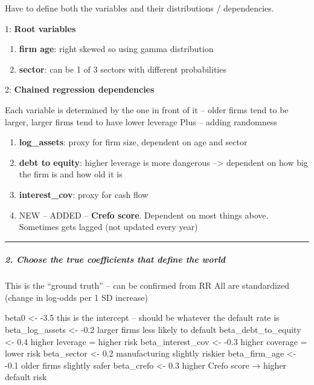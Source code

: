 \documentclass[
]{article}
\providecommand{\tightlist}{%
  \setlength{\itemsep}{0pt}\setlength{\parskip}{0pt}}
\begin{document}
Have to define both the variables and their distributions /
dependencies.

1: \textbf{Root variables}

\begin{enumerate}
\def\labelenumi{\alph{enumi})}
\tightlist
\item
  \textbf{firm age}: right skewed so using gamma distribution
\item
  \textbf{sector}: can be 1 of 3 sectors with different probabilities
\end{enumerate}

2: \textbf{Chained regression dependencies}

Each variable is determined by the one in front of it -- older firms
tend to be larger, larger firms tend to have lower leverage Plus --
adding randomness

\begin{enumerate}
\def\labelenumi{\alph{enumi})}
\setcounter{enumi}{2}
\tightlist
\item
  \textbf{log\_assets}: proxy for firm size, dependent on age and sector
\item
  \textbf{debt to equity}: higher leverage is more dangerous
  --\textgreater{} dependent on how big the firm is and how old it is
\item
  \textbf{interest\_cov}: proxy for cash flow
\item
  NEW -- ADDED -- \textbf{Crefo score}. Dependent on most things above.
  Sometimes gets lagged (not updated every year)
\end{enumerate}

\begin{center}\rule{0.5\linewidth}{0.5pt}\end{center}

\subparagraph{\texorpdfstring{\textbf{2. Choose the true coefficients
that define the
world}}{2. Choose the true coefficients that define the world}}\label{choose-the-true-coefficients-that-define-the-world}

This is the ``ground truth'' -- can be confirmed from RR All are
standardized (change in log-odds per 1 SD increase)

beta0 \textless- -3.5 this is the intercept -- should be whatever the
default rate is beta\_log\_assets \textless- -0.2 larger firms less
likely to default beta\_debt\_to\_equity \textless- 0.4 higher leverage
= higher risk beta\_interest\_cov \textless- -0.3 higher coverage =
lower risk beta\_sector \textless- 0.2 manufacturing slightly riskier
beta\_firm\_age \textless- -0.1 older firms slightly safer beta\_crefo
\textless- 0.3 higher Crefo score → higher default risk
\end{document}
